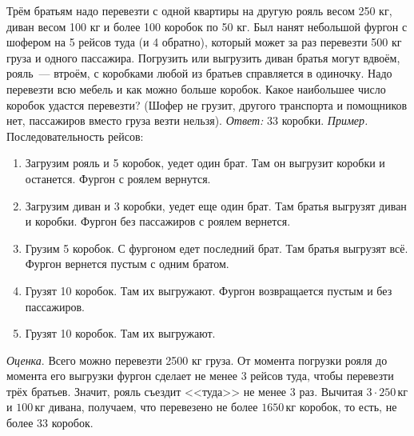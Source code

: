 \problem
Трём братьям надо перевезти с одной квартиры на другую рояль весом 250 кг,
диван весом 100 кг и более 100 коробок по 50 кг.
Был нанят небольшой фургон с шофером на 5 рейсов туда (и 4 обратно), который
может за раз перевезти 500 кг груза и одного пассажира.
Погрузить или выгрузить диван братья могут вдвоём, рояль~--- втроём, с
коробками любой из братьев справляется в одиночку.
Надо перевезти всю мебель и как можно больше коробок.
Какое наибольшее число коробок удастся перевезти?
(Шофер не грузит, другого транспорта и помощников нет, пассажиров вместо груза
везти нельзя).
\solution
\emph{Ответ:} 33 коробки.
\emph{Пример.}
Последовательность рейсов:
\begin{enumerate}
\item
Загрузим рояль и 5 коробок, уедет один брат.
Там он выгрузит коробки и останется.
Фургон с роялем вернутся.
\item
Загрузим диван и 3 коробки, уедет еще один брат.
Там братья выгрузят диван и коробки.
Фургон без пассажиров с роялем вернется.
\item
Грузим 5 коробок.
С фургоном едет последний брат.
Там братья выгрузят всё.
Фургон вернется пустым с одним братом.
\item
Грузят 10 коробок.
Там их выгружают.
Фургон возвращается пустым и без пассажиров.
\item
Грузят 10 коробок.
Там их выгружают.
\end{enumerate}
\emph{Оценка}.
Всего можно перевезти 2500 кг груза.
От момента погрузки рояля до момента его выгрузки фургон сделает не менее 3
рейсов туда, чтобы перевезти трёх братьев.
Значит, рояль съездит <<туда>> не менее 3 раз.
Вычитая $3 \cdot 250 \, \text{кг}$ и $100 \, \text{кг}$ дивана, получаем, что
перевезено не более $1650 \, \text{кг}$ коробок, то есть, не более 33 коробок.
\endproblem
